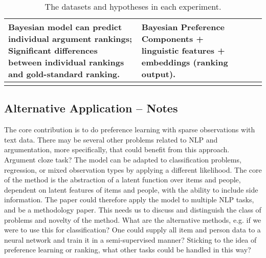 \begin{table*}
\begin{tabularx}{\textwidth}{ l  X  X  X }
  Bayesian model can predict individual argument rankings;\newline
  Significant differences between individual rankings and gold-standard ranking. &
  Bayesian Preference Components + linguistic features + embeddings (ranking output). \\\hline\\ 
  \end{tabularx}
  \caption{\label{tab:expt_data} The datasets and hypotheses in each experiment.}
\end{table*}

\subsection{Alternative Application -- Notes}

The core contribution is to do preference learning with sparse observations with text data. 
There may be several other problems related to NLP and argumentation, more specifically, that
could benefit from this approach. 
Argument cloze task? 
The model can be adapted to classification problems, regression, or mixed observation types by applying a different likelihood. The core of the method is the abstraction of a latent function over items and people, dependent on latent features of items and people, with the ability to include side information.
The paper could therefore apply the model to multiple NLP tasks, and be a methodology paper. 
This needs us to discuss and distinguish the class of problems and novelty of the method. 
What are the alternative methods, e.g. if we were to use this for classification? One could supply all 
item and person data to a neural network and train it in a semi-supervised manner?
Sticking to the idea of preference learning or ranking, what other tasks could be handled in this way?
